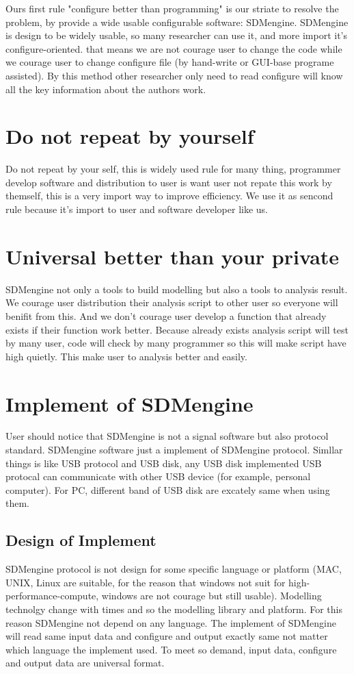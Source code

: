 \documentclass[10pt,a4paper]{report}
\begin{document}
Ours first rule "configure better than programming" is our striate to resolve the problem, by provide a wide usable configurable software: SDMengine. SDMengine is design to be widely usable, so many researcher can use it, and more import it's configure-oriented. that means we are not courage user to change the code while we courage user to change configure file (by hand-write or GUI-base programe assisted). By this method other researcher only need to read configure will know all the key information about the authors work.

\section{Do not repeat by yourself}
Do not repeat by your self, this is widely used rule for many thing, programmer develop software and distribution to user is want user not repate this work by themself, this is a very import way to improve efficiency. We use it as sencond rule because it's import to user and software developer like us.

\section{Universal better than your private}
SDMengine not only a tools to build modelling but also a tools to analysis result. We courage user distribution their analysis script to other user so everyone will benifit from this. And we don't courage user develop a function that already exists if their function work better. Because already exists analysis script will test by many user, code will check by many programmer so this will make script have high quietly. This make user to analysis better and easily.

\section{Implement of SDMengine}
User should notice that SDMengine is not a signal software but also protocol standard. SDMengine software just a implement of SDMengine protocol. Simllar things is like USB protocol and USB disk, any USB disk implemented USB protocal can communicate with other USB device (for example, personal computer). For PC, different band of USB disk are excately same when using them.
\subsection{Design of Implement}
SDMengine protocol is not design for some specific language or platform (MAC, UNIX, Linux are suitable, for the reason that windows not suit for high-performance-compute, windows are not courage but still usable). Modelling technolgy change with times and so the modelling library and platform. For this reason SDMengine not depend on any language. The implement of SDMengine will read same input data and configure and output exactly same not matter which language the implement used. To meet so demand, input data, configure and output data are universal format.
\end{document}
